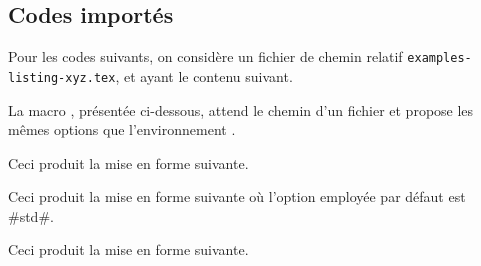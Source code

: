 \documentclass[10pt, a4paper]{article}
\begin{document}
\subsection{Codes importés}

Pour les codes suivants, on considère un fichier de chemin relatif \verb+examples-listing-xyz.tex+, et ayant le contenu suivant.


\medskip

La macro , présentée ci-dessous, attend le chemin d'un fichier et propose les mêmes options que l'environnement .




\begin{tdocexa}
    \leavevmode

    \begin{tdoclatex}[code]
    \end{tdoclatex}

    Ceci produit la mise en forme suivante.

\end{tdocexa}




\begin{tdocexa}[À la suite]
    \leavevmode

    \begin{tdoclatex}[code]
    \end{tdoclatex}

    Ceci produit la mise en forme suivante où l'option employée par défaut est \tdocinlatex#std#.

\end{tdocexa}




\begin{tdocexa}
    \leavevmode

    \begin{tdoclatex}[code]
    \end{tdoclatex}

    Ceci produit la mise en forme suivante.

\end{tdocexa}
\end{document}
